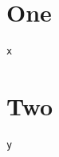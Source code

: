 \documentclass{book}
\begin{document}
\chapter{One}
\begin{lstlisting}[caption={A}]
x
\end{lstlisting}
\chapter{Two}
\begin{lstlisting}[caption={B}]
y
\end{lstlisting}
\thelstlisting
\end{document}
